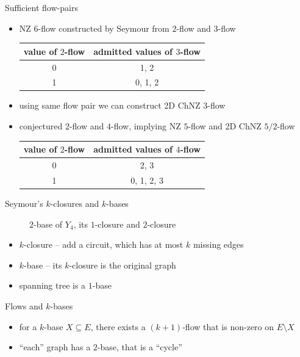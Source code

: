\documentclass{beamer}
\begin{document}
\begin{frame}{Sufficient flow-pairs}
	\begin{itemize}
		\item NZ $6$-flow constructed by Seymour from $2$-flow and $3$-flow
		\begin{center}\begin{tabular}{c|c}
			value of $2$-flow & admitted values of $3$-flow\\ \hline
			0 & 1, 2\\
			1 & 0, 1, 2
		\end{tabular}\end{center}
		\item using same flow pair we can construct 2D ChNZ $3$-flow
		\item conjectured $2$-flow and $4$-flow, implying NZ $5$-flow and 2D ChNZ $5/2$-flow
		\begin{center}\begin{tabular}{c|c}
			value of $2$-flow & admitted values of $4$-flow\\ \hline
			0 & 2, 3\\
			1 & 0, 1, 2, 3
		\end{tabular}\end{center}
	\end{itemize}
\end{frame}

\begin{frame}{Seymour's $k$-closures and $k$-bases}
	\begin{figure}
		\centering
		
		\caption{$2$-base of $Y_4$, its $1$-closure and $2$-closure}
	\end{figure}
	\begin{itemize}
		\item $k$-closure -- add a circuit, which has at most $k$ missing edges
		\item $k$-base -- its $k$-closure is the original graph
		\item spanning tree is a $1$-base
	\end{itemize}
\end{frame}

\begin{frame}{Flows and $k$-bases}
	\begin{itemize}
		\item for a $k$-base $X\subseteq E$, there exists a $(k+1)$-flow that is non-zero on $E\setminus X$
		\item ``each'' graph has a $2$-base, that is a ``cycle''
	\end{itemize}
\end{frame}
\end{document}
